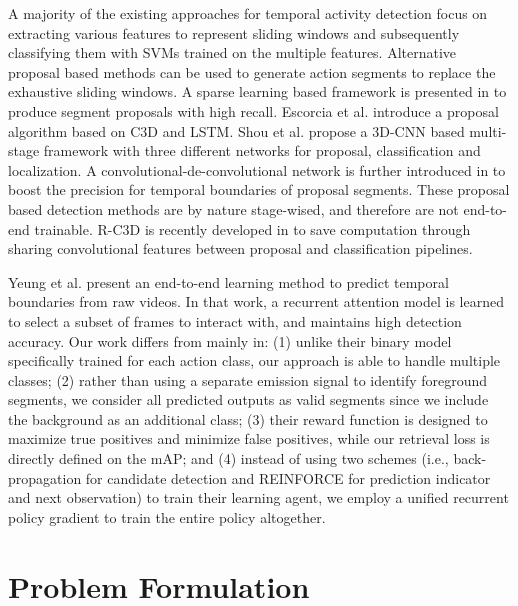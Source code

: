 \documentclass{bmvc2k}
\begin{document}
A majority of the existing approaches \cite{upc, oneata2014lear, singh2016untrimmed, wang2014action, score-pyramid} for temporal activity detection focus on extracting various features to represent sliding windows and subsequently classifying them with SVMs trained on the multiple features. Alternative proposal based methods can be used to generate action segments to replace the exhaustive sliding windows. A sparse learning based framework is presented in \cite{fast-proposal} to produce segment proposals with high recall. Escorcia et al. \cite{daps} introduce a proposal algorithm based on C3D and LSTM. Shou et al. \cite{shou2016temporal} propose a 3D-CNN based multi-stage framework with three different networks for proposal, classification and localization. A convolutional-de-convolutional network is further introduced in \cite{DBLP:journals/corr/ShouCZMC17} to boost the precision for temporal boundaries of proposal segments. These proposal based detection methods are by nature stage-wised, and therefore are not end-to-end trainable. R-C3D is recently developed in \cite{r-c3d} to save computation through sharing convolutional features between proposal and classification pipelines. 

Yeung et al. \cite{yeung2015end} present an end-to-end learning method to predict temporal boundaries from raw videos. In that work, a recurrent attention model is learned to select a subset of frames to interact with, and maintains high detection accuracy. Our work differs from \cite{yeung2015end} mainly in: (1) unlike their binary model specifically trained for each action class, our approach is able to handle multiple classes; (2) rather than using a separate emission signal to identify foreground segments, we consider all predicted outputs as valid segments since we include the background as an additional class; (3) their reward function is designed to maximize true positives and minimize false positives, while our retrieval loss is directly defined on the mAP; and (4) instead of using two schemes (i.e., back-propagation for candidate detection and REINFORCE for prediction indicator and next observation) to train their learning agent, we employ a unified recurrent policy gradient to train the entire policy altogether.

\section{Problem Formulation}
\label{sec:problem-formulation}
\end{document}
